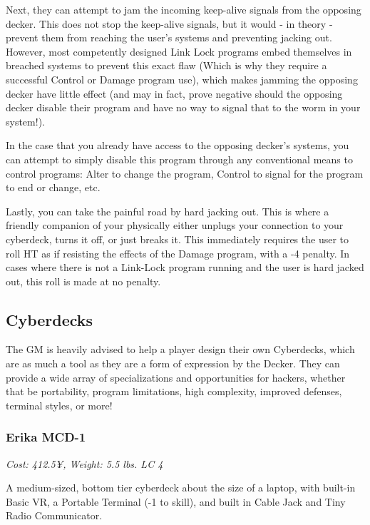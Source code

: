 \begin{multicols*}{3}
	Next, they can attempt to jam the incoming keep-alive signals from the opposing decker. This does not stop the keep-alive signals, but it would - in theory - prevent them from reaching the user's systems and preventing jacking out. However, most competently designed Link Lock programs embed themselves in breached systems to prevent this exact flaw (Which is why they require a successful Control or Damage program use), which makes jamming the opposing decker have little effect (and may in fact, prove negative should the opposing decker disable their program and have no way to signal that to the worm in your system!).
	
	In the case that you already have access to the opposing decker's systems, you can attempt to simply disable this program through any conventional means to control programs: Alter to change the program, Control to signal for the program to end or change, etc.
	
	Lastly, you can take the painful road by hard jacking out. This is where a friendly companion of your physically either unplugs your connection to your cyberdeck, turns it off, or just breaks it. This immediately requires the user to roll HT as if resisting the effects of the Damage program, with a -4 penalty. In cases where there is not a Link-Lock program running and the user is hard jacked out, this roll is made at no penalty.
	
	\subsection{Cyberdecks}
	
	The GM is heavily advised to help a player design their own Cyberdecks, which are as much a tool as they are a form of expression by the Decker. They can provide a wide array of specializations and opportunities for hackers, whether that be portability, program limitations, high complexity, improved defenses, terminal styles, or more!
	
	\subsubsection*{Erika MCD-1}
	
	\textit{\textcolor{NavyBlue}{Cost: 412.5¥, Weight: 5.5 lbs. LC 4}}
	
	A medium-sized, bottom tier cyberdeck about the size of a laptop, with built-in Basic VR, a Portable Terminal (-1 to skill), and built in Cable Jack and Tiny Radio Communicator.
	

\end{multicols*}

